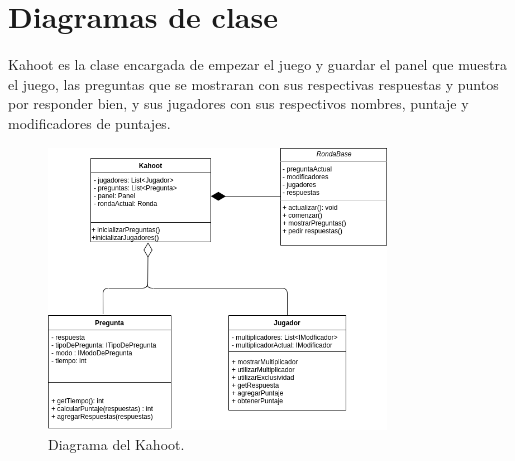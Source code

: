 \documentclass[titlepage,a4paper]{article}
\begin{document}
\section{Diagramas de clase}\label{sec:diagramasdeclase}

Kahoot es la clase encargada de empezar el juego y guardar el panel que muestra el juego, las preguntas que se mostraran con sus respectivas respuestas y puntos por responder bien, y sus jugadores con sus respectivos nombres, puntaje y modificadores de puntajes.

\begin{figure}[H]
\centering
\includegraphics[width=0.8\textwidth]{diagramaGeneral.png}
\caption{\label{fig:class01}Diagrama del Kahoot.}
\end{figure}
\end{document}
